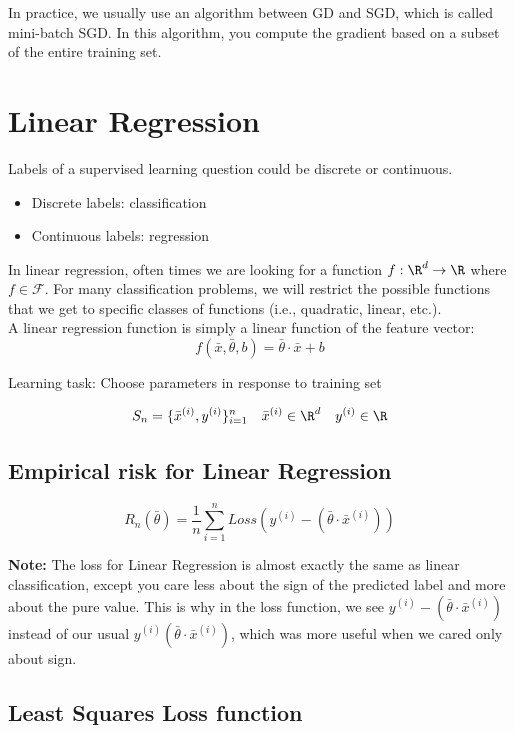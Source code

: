 \documentclass[12pt]{article}
\begin{document}
In practice, we usually use an algorithm between GD and SGD, which is called mini-batch SGD. In this algorithm, you compute the gradient based on a subset of the entire training set.

\section{Linear Regression}

Labels of a supervised learning question could be discrete or continuous.
\begin{itemize}
	\item Discrete labels: classification
	\item Continuous labels: regression
\end{itemize}

In linear regression, often times we are looking for a function $f: \R^d \rightarrow \R$ where $f \in \mathcal{F}$. For many classification problems, we will restrict the possible functions that we get to specific classes of functions (i.e., quadratic, linear, etc.).\\

A linear regression function is simply a linear function of the feature vector:
\[ f(\bar x, \bar{\theta}, b) = \bar{\theta} \cdot \bar x + b \]

Learning task: Choose parameters in response to training set

\[ S_n = \{ \bar{x}^{(i)}, y^{(i)} \}_{i=1}^n \quad \bar x^{(i)} \in \R^d \quad y^{(i)} \in \R \]

\subsection{Empirical risk for Linear Regression}

\[ R_n(\bar{\theta}) = \frac 1 n \sum_{i=1}^n Loss(y^{(i)} - (\bar{\theta} \cdot \bar{x}^{(i)})) \]

\textbf{Note:} The loss for Linear Regression is almost exactly the same as linear classification, except you care less about the sign of the predicted label and more about the pure value. This is why in the loss function, we see $y^{(i)} - (\bar{\theta} \cdot \bar x^{(i)})$ instead of our usual $y^{(i)}(\bar{\theta} \cdot \bar x^{(i)})$, which was more useful when we cared only about sign.

\subsection{Least Squares Loss function}
\end{document}

